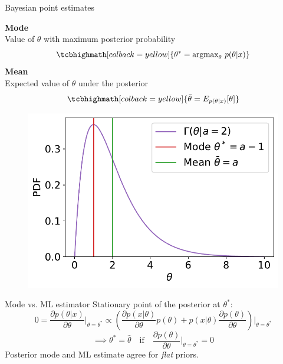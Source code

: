 \documentclass[
aspectratio=169,
14pt,
professionalfonts
]{beamer}
\begin{document}
\begin{frame}{Bayesian point estimates}
    \begin{minipage}{0.49\textwidth}
        \textbf{Mode}\\ Value of $\theta$ with maximum posterior probability
            $$
            \tcbhighmath[colback=yellow]{
            \theta^* = \text{argmax}_\theta ~ p(\theta|x)
            }
            $$
        \textbf{Mean}\\ Expected value of $\theta$ under the posterior
            $$
            \tcbhighmath[colback=yellow]{ 
            \bar{\theta} = E_{p(\theta|x)}[\theta]
            }
            $$
    \end{minipage}
    \begin{minipage}{0.49\textwidth}
        \begin{figure}
            \centering
            \includegraphics[width=\linewidth]{../plots/map_vs_mean.pdf}
        \end{figure}
    \end{minipage}
\end{frame}

\begin{frame}{Mode vs. ML estimator}
        Stationary point of the posterior at $\theta^*$:
        $$0=\frac{\partial p(\theta|x)}{\partial \theta}\bigg\vert_{\theta = \theta^*} \propto 
        \left(
            \frac{\partial p(x|\theta)}{\partial \theta}p(\theta) + p(x|\theta) \frac{\partial p(\theta)}{\partial \theta}\right)\bigg\vert_{\theta = \theta^*}$$
        $$\implies \theta^* = \hat \theta \quad \text{if} \quad \frac{\partial p(\theta)}{\partial \theta}\bigg\vert_{\theta = \theta^*}=0$$
        Posterior mode and ML estimate agree for \textit{flat} priors.
\end{frame}
\end{document}
